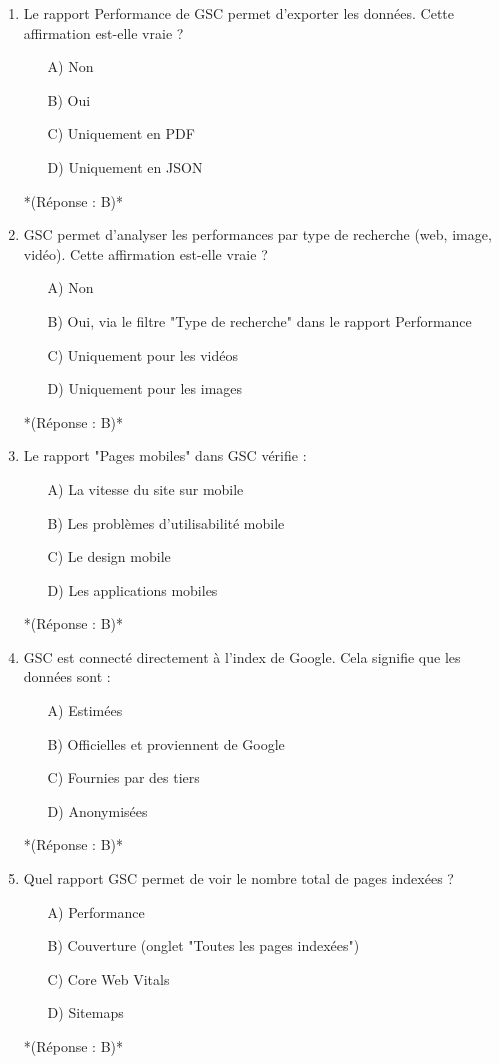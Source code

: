 \documentclass[12pt,a4paper,twoside]{report}
\begin{document}
\begin{enumerate}
    \item Le rapport Performance de GSC permet d'exporter les données. Cette affirmation est-elle vraie ?
    \begin{itemize}
        \item[A)] Non
        \item[B)] Oui
        \item[C)] Uniquement en PDF
        \item[D)] Uniquement en JSON
    \end{itemize}
    *(Réponse : B)*

    \item GSC permet d'analyser les performances par type de recherche (web, image, vidéo). Cette affirmation est-elle vraie ?
    \begin{itemize}
        \item[A)] Non
        \item[B)] Oui, via le filtre "Type de recherche" dans le rapport Performance
        \item[C)] Uniquement pour les vidéos
        \item[D)] Uniquement pour les images
    \end{itemize}
    *(Réponse : B)*

    \item Le rapport "Pages mobiles" dans GSC vérifie :
    \begin{itemize}
        \item[A)] La vitesse du site sur mobile
        \item[B)] Les problèmes d'utilisabilité mobile
        \item[C)] Le design mobile
        \item[D)] Les applications mobiles
    \end{itemize}
    *(Réponse : B)*

    \item GSC est connecté directement à l'index de Google. Cela signifie que les données sont :
    \begin{itemize}
        \item[A)] Estimées
        \item[B)] Officielles et proviennent de Google
        \item[C)] Fournies par des tiers
        \item[D)] Anonymisées
    \end{itemize}
    *(Réponse : B)*

    \item Quel rapport GSC permet de voir le nombre total de pages indexées ?
    \begin{itemize}
        \item[A)] Performance
        \item[B)] Couverture (onglet "Toutes les pages indexées")
        \item[C)] Core Web Vitals
        \item[D)] Sitemaps
    \end{itemize}
    *(Réponse : B)*


\end{enumerate}
\end{document}
